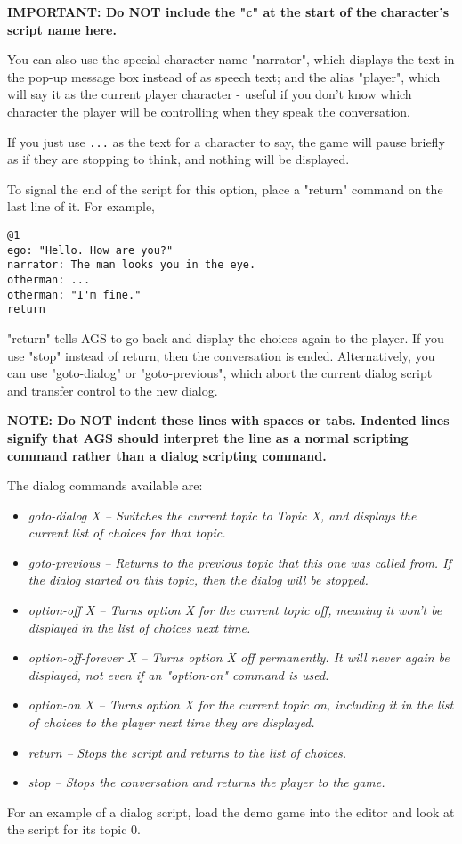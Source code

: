 \bf{IMPORTANT:} Do \bf{NOT} include the "c" at the start of the character's
script name here.

You can also use the special character name "narrator", which
displays the text in the pop-up message box instead of as speech text; and the
alias "player", which will say it as the current player character - useful if
you don't know which character the player will be controlling when they speak
the conversation.

If you just use \verb$...$ as the text for a character to say, the game will
pause briefly as if they are stopping to think, and nothing will be displayed.

To signal the end of the script for this option, place a "return" command on
the last line of it. For example,
\begin{verbatim}
@1
ego: "Hello. How are you?"
narrator: The man looks you in the eye.
otherman: ...
otherman: "I'm fine."
return
\end{verbatim}
"return" tells AGS to go back and display the choices again to the player.
If you use "stop" instead of return, then the conversation is ended. Alternatively,
you can use "goto-dialog" or "goto-previous", which abort the current dialog script
and transfer control to the new dialog.

\bf{NOTE:} Do \bf{NOT} indent these lines with spaces or tabs. Indented lines
signify that AGS should interpret the line as a normal scripting command
rather than a dialog scripting command.

The dialog commands available are:
\begin{itemize}\itemsep=10pt
\item \it{goto-dialog X} -- Switches the current topic to Topic X, and displays the current list of
  choices for that topic.
\item \it{goto-previous} -- Returns to the previous topic that this one was called from. If the dialog
  started on this topic, then the dialog will be stopped.
\item \it{option-off X} -- Turns option X for the current topic off, meaning it won't be displayed in
  the list of choices next time.
\item \it{option-off-forever X} -- Turns option X off permanently. It will never again be displayed, not even
  if an "option-on" command is used.
\item \it{option-on X} -- Turns option X for the current topic on, including it in the list of choices
  to the player next time they are displayed.
\item \it{return} -- Stops the script and returns to the list of choices.
\item \it{stop} -- Stops the conversation and returns the player to the game.
\end{itemize}
For an example of a dialog script, load the demo game into the editor and
look at the script for its topic 0.

